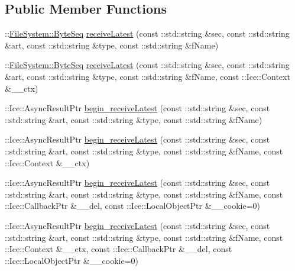 \subsection*{Public Member Functions}
\begin{DoxyCompactItemize}
\item 
\+::\hyperlink{namespace_file_system_a5c85de065f9c451ae1d1dea2dacb68c5}{File\+System\+::\+Byte\+Seq} \hyperlink{class_ice_proxy_1_1_file_system_1_1_file_aa235edc359a9e7cd57aadd063078c48c}{receive\+Latest} (const \+::std\+::string \&sec, const \+::std\+::string \&art, const \+::std\+::string \&type, const \+::std\+::string \&f\+Name)
\item 
\+::\hyperlink{namespace_file_system_a5c85de065f9c451ae1d1dea2dacb68c5}{File\+System\+::\+Byte\+Seq} \hyperlink{class_ice_proxy_1_1_file_system_1_1_file_a03bd9459852dd73aa6d9945160a7dc81}{receive\+Latest} (const \+::std\+::string \&sec, const \+::std\+::string \&art, const \+::std\+::string \&type, const \+::std\+::string \&f\+Name, const \+::Ice\+::\+Context \&\+\_\+\+\_\+ctx)
\item 
\+::Ice\+::\+Async\+Result\+Ptr \hyperlink{class_ice_proxy_1_1_file_system_1_1_file_ab0bfc4cf2f256f81a0b7b0fe9bb09b94}{begin\+\_\+receive\+Latest} (const \+::std\+::string \&sec, const \+::std\+::string \&art, const \+::std\+::string \&type, const \+::std\+::string \&f\+Name)
\item 
\+::Ice\+::\+Async\+Result\+Ptr \hyperlink{class_ice_proxy_1_1_file_system_1_1_file_a30a10d0bcea0de70b3f9c47ed5e91b2b}{begin\+\_\+receive\+Latest} (const \+::std\+::string \&sec, const \+::std\+::string \&art, const \+::std\+::string \&type, const \+::std\+::string \&f\+Name, const \+::Ice\+::\+Context \&\+\_\+\+\_\+ctx)
\item 
\+::Ice\+::\+Async\+Result\+Ptr \hyperlink{class_ice_proxy_1_1_file_system_1_1_file_a3037db699157ab957468c3a77afca147}{begin\+\_\+receive\+Latest} (const \+::std\+::string \&sec, const \+::std\+::string \&art, const \+::std\+::string \&type, const \+::std\+::string \&f\+Name, const \+::Ice\+::\+Callback\+Ptr \&\+\_\+\+\_\+del, const \+::Ice\+::\+Local\+Object\+Ptr \&\+\_\+\+\_\+cookie=0)
\item 
\+::Ice\+::\+Async\+Result\+Ptr \hyperlink{class_ice_proxy_1_1_file_system_1_1_file_a2a122da9b3a0d5e3191017c4b0f28390}{begin\+\_\+receive\+Latest} (const \+::std\+::string \&sec, const \+::std\+::string \&art, const \+::std\+::string \&type, const \+::std\+::string \&f\+Name, const \+::Ice\+::\+Context \&\+\_\+\+\_\+ctx, const \+::Ice\+::\+Callback\+Ptr \&\+\_\+\+\_\+del, const \+::Ice\+::\+Local\+Object\+Ptr \&\+\_\+\+\_\+cookie=0)

\end{DoxyCompactItemize}
